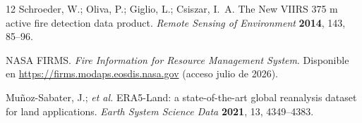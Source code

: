 \documentclass[11pt,a4paper]{article}
\begin{document}
\begin{thebibliography}{12}
Schroeder, W.; Oliva, P.; Giglio, L.; Csiszar, I.~A.
The New VIIRS 375 m active fire detection data product. \emph{Remote
Sensing of Environment} \textbf{2014}, 143, 85--96.

NASA FIRMS. \emph{Fire Information for Resource Management System}.
Disponible en \url{https://firms.modaps.eosdis.nasa.gov} (acceso julio de
2026).

Muñoz-Sabater, J.; \emph{et al.}
ERA5-Land: a state-of-the-art global reanalysis dataset for land
applications. \emph{Earth System Science Data} \textbf{2021}, 13,
4349--4383.

\end{thebibliography}
\end{document}
